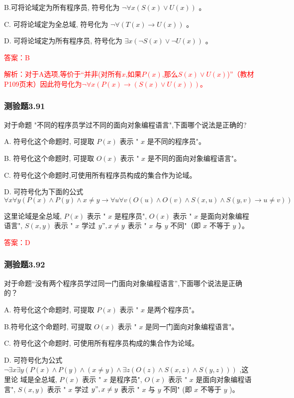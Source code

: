 \documentclass[UTF8, heading=true]{ctexart}
\begin{document}
B.可将论域定为所有程序员, 符号化为 $\neg \forall x(S(x) \vee U(x))$ 。

C. 可将论域定为全总域, 符号化为 $\neg \forall(T(x) \rightarrow U(x))$ 。

D. 可将论域定为所有程序员, 符号化为 $\exists x(\neg S(x) \vee \neg U(x))$ 。

\textcolor{red}{答案：B}

\textcolor{red}{解析：对于A选项,等价于“并非(对所有$x$,如果$P(x)$,那么$S(x) \vee U(x)$)”（教材P109页末）因此符号化为$\neg \forall x(P(x) \rightarrow (S(x) \vee U(x)))$。}

\subsubsection{测验题3.91}

对于命题 "不同的程序员学过不同的面向对象编程语言",下面哪个说法是正确的?

A.  符号化这个命题时, 可提取 $P(x)$ 表示 " $x$ 是不同的程序员"。

B.  符号化这个命题时, 可提取 $O(x)$ 表示 " $x$ 是不同的面向对象编程语言"。

C.   符号化这个命题时,可使用所有程序员构成的集合作为论域。

D. 
可符号化为下面的公式
$$
\forall x \forall y(P(x) \wedge P(y) \wedge x \neq y \rightarrow \forall u \forall v(O(u) \wedge O(v) \wedge S(x, u) \wedge S(y, v) \rightarrow u \neq v))
$$

这里论域是全总域, $P(x)$ 表示 " $x$ 是程序员", $O(x)$ 表示 " $x$ 是面向对象编程语言", $S(x, y)$ 表示 " $x$ 学过 $y ", x \neq y$ 表示 " $x$ 与 $y$ 不同"（即 $x$ 不等于 $y$ ）。


\textcolor{red}{答案：D}

\subsubsection{测验题3.92}

对于命题“没有两个程序员学过同一门面向对象编程语言”,下面哪个说法是正确的？

A. 符号化这个命题时, 可提取 $P(x)$ 表示 " $x$ 是两个程序员"。

B.符号化这个命题时, 可提取 $O(x)$ 表示 " $x$ 是同一门面向对象编程语言"。

C. 符号化这个命题时, 可使用所有程序员构成的集合作为论域。

D. 可符号化为公式 $\neg \exists x \exists y(P(x) \wedge P(y) \wedge(x \neq y) \wedge \exists z(O(z) \wedge S(x, z) \wedge S(y, z)))$ ,这里论
域是全总域, $P(x)$ 表示 " $x$ 是程序员", $O(x)$ 表示 " $x$ 是面向对象编程语言", $S(x, y)$ 表示 " $x$ 学过 $y ", x \neq y$ 表示 " $x$ 与 $y$ 不同" (即 $x$ 不等于 $y$ )。
\end{document}
